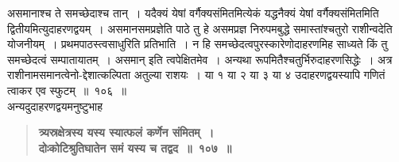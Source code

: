 \documentclass[11pt, openany]{book}
\begin{document}
\begin{sloppypar}
असमानाश्च ते समच्छेदाश्च तान्~। यदैक्यं येषां वर्गैक्यसंमितमित्येकं यद्धनैक्यं येषां वर्गैक्यसंमितमिति द्वितीयमित्युदाहरणद्वयम्~। असमानसमप्रज्ञेति पाठे तु हे असमप्रज्ञ निरुपमबुद्धे समास्तांश्चतुरो राशीन्वदेति योजनीयम्~। प्रथमपाठस्त्वसाधुरिति प्रतिभाति~। न हि समच्छेदत्वपुरस्कारेणोदाहरणमिह साध्यते किं तु समच्छेदत्वं सम्पातायातम्~। असमान् इति त्वपेक्षितमेव~। अन्यथा रूपमितैश्चतुर्भिरुदाहरणसिद्धेः~। अत्र राशीनामसमानत्वेनो-द्देशात्कल्पिता अतुल्या राशयः~। या १ या २ या ३ या ४ उदाहरणद्वयस्यापि गणितं त्वाकर एव स्फुटम्~॥~१०६~॥ \\

{\small अन्यदुदाहरणद्वयमनुष्टुभाह\textendash }

 \label{7.107}
\begin{quote}
{\large \textbf{{\color{purple}त्र्यस्रक्षेत्रस्य यस्य स्यात्फलं कर्णेन संमितम्~।\\
दोःकोटिश्रुतिघातेन समं यस्य च तद्वद~॥~१०७~॥}}}
\end{quote}
\end{sloppypar}

\newpage
\end{document}
